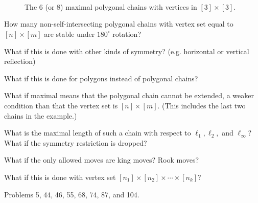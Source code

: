 \documentclass{article}
\begin{document}
\begin{figure}[ht!]
  ~~~
  ~~~
  ~~~
  \caption{The $6$ (or $8$) maximal polygonal chains with vertices in $[3] \times [3]$.}
\end{figure}

\begin{question}
  How many non-self-intersecting polygonal chains with vertex set equal to
  $[n] \times [m]$ are stable under $180^\circ$ rotation?
\end{question}

\begin{related}
  \item What if this is done with other kinds of symmetry?
  (e.g. horizontal or vertical reflection)
  \item What if this is done for polygons instead of polygonal chains?
  \item What if maximal means that the polygonal chain cannot be extended, a
  weaker condition than that the vertex set is $[n] \times [m]$.
  (This includes the last two chains in the example.)
  \item What is the maximal length of such a chain with respect to
    $\ell_1, \ell_2,$ and $\ell_\infty$?
    What if the symmetry restriction is dropped?
  \item What if the only allowed moves are king moves? Rook moves?
  \item What if this is done with vertex set
    $[n_1] \times [n_2] \times \cdots \times [n_k]$?
\end{related}

\begin{references}
  \item Problems 5, 44, 46, 55, 68, 74, 87, and 104.
\end{references}
\end{document}
